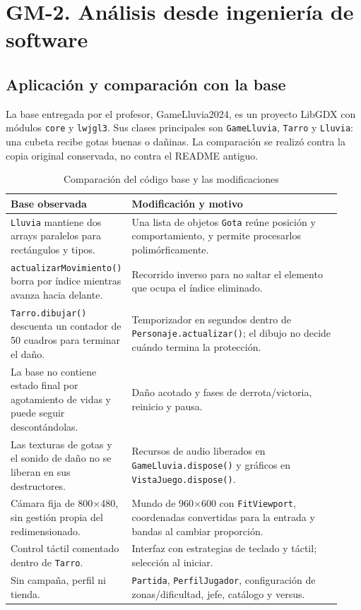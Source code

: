 \section{GM-2. Análisis desde ingeniería de software}

\subsection*{Aplicación y comparación con la base}

La base entregada por el profesor, GameLluvia2024, es un proyecto LibGDX con módulos \texttt{core} y \texttt{lwjgl3}. Sus clases principales son \texttt{GameLluvia}, \texttt{Tarro} y \texttt{Lluvia}: una cubeta recibe gotas buenas o dañinas. La comparación se realizó contra la copia original conservada, no contra el README antiguo.

{\small
\begin{longtable}{p{0.27\linewidth}p{0.66\linewidth}}
\caption{Comparación del código base y las modificaciones}\\
\toprule
Base observada & Modificación y motivo \\
\midrule
\endhead
\texttt{Lluvia} mantiene dos arrays paralelos para rectángulos y tipos. & Una lista de objetos \texttt{Gota} reúne posición y comportamiento, y permite procesarlos polimórficamente. \\
\texttt{actualizarMovimiento()} borra por índice mientras avanza hacia delante. & Recorrido inverso para no saltar el elemento que ocupa el índice eliminado. \\
\texttt{Tarro.dibujar()} descuenta un contador de 50 cuadros para terminar el daño. & Temporizador en segundos dentro de \texttt{Personaje.actualizar()}; el dibujo no decide cuándo termina la protección. \\
La base no contiene estado final por agotamiento de vidas y puede seguir descontándolas. & Daño acotado y fases de derrota/victoria, reinicio y pausa. \\
Las texturas de gotas y el sonido de daño no se liberan en sus destructores. & Recursos de audio liberados en \texttt{GameLluvia.dispose()} y gráficos en \texttt{VistaJuego.dispose()}. \\
Cámara fija de 800$\times$480, sin gestión propia del redimensionado. & Mundo de 960$\times$600 con \texttt{FitViewport}, coordenadas convertidas para la entrada y bandas al cambiar proporción. \\
Control táctil comentado dentro de \texttt{Tarro}. & Interfaz con estrategias de teclado y táctil; selección al iniciar. \\
Sin campaña, perfil ni tienda. & \texttt{Partida}, \texttt{PerfilJugador}, configuración de zonas/dificultad, jefe, catálogo y versus. \\
\bottomrule
\end{longtable}
}

